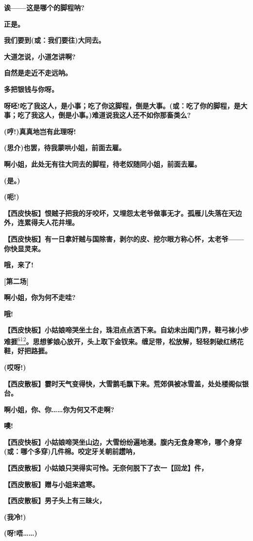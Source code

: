 \textbf{诶------这是哪个的脚程呐?}

\textbf{正是。}

\textbf{我们要到(或：我们要往)大同去。}

\textbf{大道怎说，小道怎讲啊?}

\textbf{自然是走近不走远呐。}

\textbf{多把银钱与你呀。}

\textbf{呀呸!吃了我这人，是小事；吃了你这脚程，倒是大事。(或：吃了你的脚程，是大事；吃了我这人，倒是小事。)难道说我这人还不如你那畜类么?}

\textbf{(哼!)真真地岂有此理呀!}

\textbf{(思介)也罢，待我蒙哄小姐，前面去雇。}

\textbf{啊小姐，此处无有往大同去的脚程，待老奴随同小姐，前面去雇。}

\textbf{(是。)}

\textbf{(呃!)}

\textbf{【西皮快板】恨贼子把我的牙咬坏，又埋怨太老爷做事无才。孤雁儿失落在天边外，连累得夫人花井埋。}

\textbf{【西皮快板】有一日拿奸贼与国除害，剥尔的皮、挖尔眼方称心怀，太老爷------你快显灵来。}

\textbf{哦，来了!}

\textbf{{[}第二场{]}}

\textbf{啊小姐，你为何不走哇?}

\textbf{哦!}

\textbf{【西皮快板】小姑娘啼哭坐土台，珠泪点点洒下来。自幼未出闺门界，鞋弓袜小步难捱}\protect\hyperlink{fn612}{\textsuperscript{612}}\textbf{。思想爹娘心放开，头上取下金钗来。缠足带，松放解，轻轻刺破红绣花鞋，好把路捱。}

\textbf{(哎呀!)}

\textbf{【西皮散板】霎时天气变得快，大雪鹅毛飘下来。荒郊俱被冰雪盖，处处楼阁似银台。}

\textbf{啊小姐，你、你\ldots{}\ldots{}你为何又不走啊?}

\textbf{噢!}

\textbf{【西皮快板】小姑娘啼哭坐山边，大雪纷纷遍地漫。腹内无食身寒冷，哪个身穿(或：哪个多穿)几件棉。咬定牙关朝前趱呐，}

\textbf{【西皮散板】小姑娘只哭得实可怜。无奈何脱下了衣一【回龙】件，}

\textbf{【西皮散板】赠与小姐来遮寒。}

\textbf{【西皮散板】男子头上有三昧火，}

\textbf{(我冷!)}

\textbf{(呀!唔\ldots{}\ldots{})}

